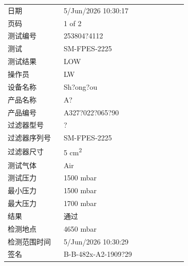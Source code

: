 \documentclass[UTF8,10pt,a4paper,fontset=fandol]{ctexart}
\newcommand{\fieldvalue}[1]{#1}
\begin{document}
\begin{tabular}{@{}p{0.28\linewidth}p{0.62\linewidth}@{}}
日期 &
\fieldvalue{5/Jun/2026 10:30:17}
\\
页码 &
\fieldvalue{1 of 2}
\\
测试编号 &
\fieldvalue{253804?4112}
\\
测试 &
\fieldvalue{SM-FPES-2225}
\\
测试结果 &
\fieldvalue{LOW}
\\
操作员 &
\fieldvalue{LW}
\\
设备名称 &
\fieldvalue{Sh?ong?ou}
\\
产品名称 &
\fieldvalue{A?}
\\
产品编号 &
\fieldvalue{A327?022?065?90}
\\
过滤器型号 &
\fieldvalue{?}
\\
过滤器序列号 &
\fieldvalue{SM-FPES-2225}
\\
过滤器尺寸 &
\fieldvalue{5 cm\textsuperscript{2}}
\\
测试气体 &
\fieldvalue{Air}
\\
测试压力 &
\fieldvalue{1500 mbar}
\\
最小压力 &
\fieldvalue{1500 mbar}
\\
最大压力 &
\fieldvalue{1700 mbar}
\\
结果 &
\fieldvalue{通过}
\\
检测地点 &
\fieldvalue{4650 mbar}
\\
检测范围时间 &
\fieldvalue{5/Jun/2026 10:30:29}
\\
签名 &
\fieldvalue{B-B-482x-A2-1909?29}
\\
\end{tabular}
\end{document}
